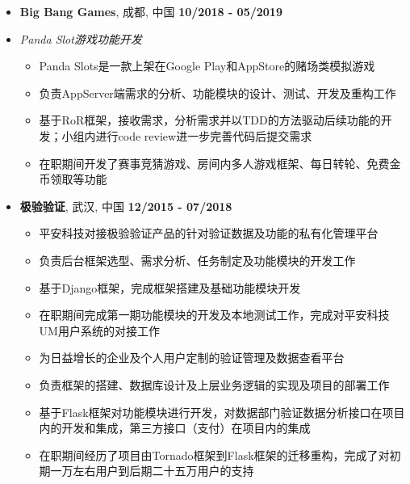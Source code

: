 \documentclass[UTF8, 12pt, a4paper,sans]{moderncv}       %
\begin{document}
    \begin{itemize}

        \item{\textbf{Big Bang Games}, {成都, 中国} \hfill\textbf{10/2018 - 05/2019}}
        \item{\textit{Panda Slot游戏功能开发}}
        \vspace{2pt}
        \begin{itemize}
            \item {\medium Panda Slots是一款上架在Google Play和AppStore的赌场类模拟游戏}
            \vspace{2pt}
            \item {\medium 负责AppServer端需求的分析、功能模块的设计、测试、开发及重构工作}
            \vspace{2pt}
            \item {\medium 基于RoR框架，接收需求，分析需求并以TDD的方法驱动后续功能的开发；小组内进行code review进一步完善代码后提交需求}
            \vspace{2pt}
            \item {\medium 在职期间开发了赛事竞猜游戏、房间内多人游戏框架、每日转轮、免费金币领取等功能}
        \end{itemize}


        \vspace{8pt}


        \item{\textbf{极验验证}, {武汉, 中国} \hfill\textbf{12/2015 - 07/2018}}
        \begin{itemize}
            \item { \medium 平安科技对接极验验证产品的针对验证数据及功能的私有化管理平台}
            \item { \medium 负责后台框架选型、需求分析、任务制定及功能模块的开发工作}
            \item { \medium 基于Django框架，完成框架搭建及基础功能模块开发}
            \item { \medium 在职期间完成第一期功能模块的开发及本地测试工作，完成对平安科技UM用户系统的对接工作}
        \end{itemize}

        \begin{itemize}
            \item { \medium 为日益增长的企业及个人用户定制的验证管理及数据查看平台}
            \item { \medium 负责框架的搭建、数据库设计及上层业务逻辑的实现及项目的部署工作}
            \item { \medium 基于Flask框架对功能模块进行开发，对数据部门验证数据分析接口在项目内的开发和集成，第三方接口（支付）在项目内的集成}
            \item { \medium 在职期间经历了项目由Tornado框架到Flask框架的迁移重构，完成了对初期一万左右用户到后期二十五万用户的支持}
        \end{itemize}


\end{itemize}
\end{document}
